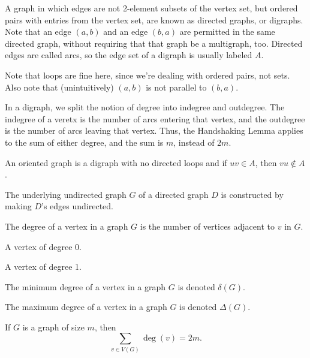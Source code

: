 \documentclass{article}
\begin{document}
\medskip{}

    A graph in which edges are not 2-element subsets of the vertex set, but ordered pairs with entries from the vertex set, are known as directed graphs, or digraphs. Note that an edge $(a,b)$ and an edge $(b,a)$ are permitted in the same directed graph, without requiring that that graph be a multigraph, too. Directed edges are called arcs, so the edge set of a digraph is usually labeled $A$.

    Note that loops are fine here, since we're dealing with ordered pairs, not sets.
    Also note that (unintuitively) $(a,b)$ is not parallel to $(b,a)$.

    In a digraph, we split the notion of degree into indegree and outdegree. The indegree of a veretx is the number of arcs entering that vertex, and the outdegree is the number of arcs leaving that vertex. Thus, the Handshaking Lemma applies to the sum of either degree, and the sum is $m$, instead of $2m$.

\medskip{}

    An oriented graph is a digraph with no directed loops and if $uv \in A$, then $vu \notin A$.

\medskip{}

    The underlying undirected graph $G$ of a directed graph $D$ is constructed by making $D$'s edges undirected.

\medskip{}

    The degree of a vertex in a graph $G$ is the number of vertices adjacent to $v$ in $G$.

\medskip{}

    A vertex of degree 0.

\medskip{}

    A vertex of degree 1.

\medskip{}

    The minimum degree of a vertex in a graph $G$ is denoted $\delta(G)$.

    The maximum degree of a vertex in a graph $G$ is denoted $\Delta(G)$.

\medskip{}

    If $G$ is a graph of size $m$, then $$\sum_{v \in V(G)} \deg(v) = 2m.$$
\end{document}
